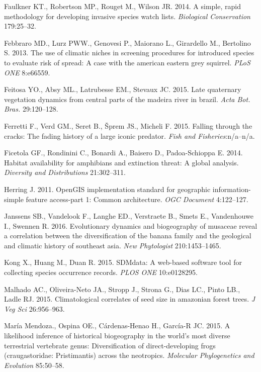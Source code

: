 \documentclass[author-year, review, 11pt]{components/elsarticle} %
\begin{document}
\hypertarget{ref-Faulkner_2014}{}
Faulkner KT., Robertson MP., Rouget M., Wilson JR. 2014. A simple, rapid
methodology for developing invasive species watch lists.
\emph{Biological Conservation} 179:25--32.

\hypertarget{ref-Di_Febbraro_2013}{}
Febbraro MD., Lurz PWW., Genovesi P., Maiorano L., Girardello M.,
Bertolino S. 2013. The use of climatic niches in screening procedures
for introduced species to evaluate risk of spread: A case with the
american eastern grey squirrel. \emph{PLoS ONE} 8:e66559.

\hypertarget{ref-Feitosa_2015}{}
Feitosa YO., Absy ML., Latrubesse EM., Stevaux JC. 2015. Late quaternary
vegetation dynamics from central parts of the madeira river in brazil.
\emph{Acta Bot. Bras.} 29:120--128.

\hypertarget{ref-Ferretti_2015}{}
Ferretti F., Verd GM., Seret B., Šprem JS., Micheli F. 2015. Falling
through the cracks: The fading history of a large iconic predator.
\emph{Fish and Fisheries}:n/a--n/a.

\hypertarget{ref-Ficetola_2014}{}
Ficetola GF., Rondinini C., Bonardi A., Baisero D., Padoa-Schioppa E.
2014. Habitat availability for amphibians and extinction threat: A
global analysis. \emph{Diversity and Distributions} 21:302--311.

\hypertarget{ref-wkt}{}
Herring J. 2011. OpenGIS implementation standard for geographic
information-simple feature access-part 1: Common architecture. \emph{OGC
Document} 4:122--127.

\hypertarget{ref-Janssens_2016}{}
Janssens SB., Vandelook F., Langhe ED., Verstraete B., Smets E.,
Vandenhouwe I., Swennen R. 2016. Evolutionary dynamics and biogeography
of musaceae reveal a correlation between the diversification of the
banana family and the geological and climatic history of southeast asia.
\emph{New Phytologist} 210:1453--1465.

\hypertarget{ref-Kong_2015}{}
Kong X., Huang M., Duan R. 2015. SDMdata: A web-based software tool for
collecting species occurrence records. \emph{PLOS ONE} 10:e0128295.

\hypertarget{ref-Malhado_2015}{}
Malhado AC., Oliveira-Neto JA., Stropp J., Strona G., Dias LC., Pinto
LB., Ladle RJ. 2015. Climatological correlates of seed size in amazonian
forest trees. \emph{J Veg Sci} 26:956--963.

\hypertarget{ref-Mendoza_2015}{}
María Mendoza., Ospina OE., Cárdenas-Henao H., García-R JC. 2015. A
likelihood inference of historical biogeography in the world's most
diverse terrestrial vertebrate genus: Diversification of
direct-developing frogs (craugastoridae: Pristimantis) across the
neotropics. \emph{Molecular Phylogenetics and Evolution} 85:50--58.
\end{document}
